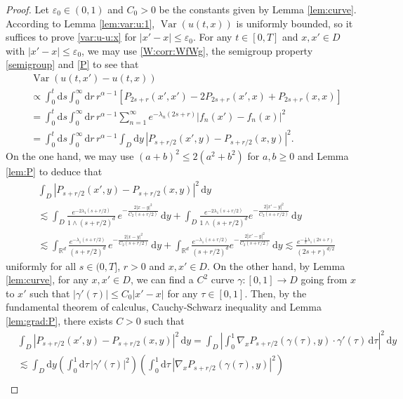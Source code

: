 \documentclass[reqno]{amsart}
\DeclareMathOperator{\Var}{Var}
\newcommand{\R}{\mathbb R}
\renewcommand{\d}{\mathrm d}
\newcommand{\1}{\mathbf 1}
\numberwithin{equation}{section}
\theoremstyle{definition}
\begin{document}
\begin{proof}
Let $\varepsilon_0 \in (0,1)$ and $C_0>0$ be the constants given by Lemma \ref{lem:curve}.
According to Lemma \ref{lem:var:u:1}, $\Var(u(t,x))$ is uniformly bounded, so it suffices to prove \eqref{var:u-u:x} for $|x'-x| \le \varepsilon_0$.
For any $t \in [0,T]$ and $x,x' \in D$ with $|x'-x|\le \varepsilon_0$, we may use \eqref{W:corr:WfWg}, the semigroup property \eqref{semigroup} and \eqref{P} to see that
\begin{align*}
	&\Var(u(t,x')-u(t,x))\\
	&\propto \int_0^t \d s \int_0^\infty \d r \, r^{\alpha-1} \left[ P_{2s+r}(x',x') - 2P_{2s+r}(x',x)+ P_{2s+r}(x,x) \right]\\
	&=\int_0^t \d s \int_0^\infty \d r \, r^{\alpha-1} \sum_{n=1}^\infty e^{-\lambda_n (2s+r)} |f_n(x')-f_n(x)|^2\\
	&=\int_0^t \d s \int_0^\infty \d r \, r^{\alpha-1} \int_D \d y\, |P_{s+r/2}(x',y)-P_{s+r/2}(x,y)|^2.
\end{align*}
On the one hand, we may use $(a+b)^2 \le 2(a^2+b^2)$ for $a,b \ge 0$ and Lemma \ref{lem:P} to deduce that
\begin{align*}
	&\int_D |P_{s+r/2}(x',y)-P_{s+r/2}(x,y)|^2 \, \d y\\
	& \lesssim \int_D \frac{e^{-2\lambda_1 (s+r/2)}}{1 \wedge (s+r/2)^d} \, e^{- \frac{2|x-y|^2}{C_2(s+r/2)}} \, \d y + \int_D \frac{e^{-2\lambda_1 (s+r/2)}}{1\wedge (s+r/2)^d} e^{- \frac{2|x'-y|^2}{C_2(s+r/2)}}  \, \d y\\
	& \lesssim \int_{\R^d} \frac{e^{-\lambda_1 (s+r/2)}}{(s+r/2)^d} \, e^{- \frac{2|x-y|^2}{C_2(s+r/2)}} \, \d y + \int_{\R^d} \frac{e^{-\lambda_1 (s+r/2)}}{ (s+r/2)^d} e^{- \frac{2|x'-y|^2}{C_2(s+r/2)}}  \, \d y
	\lesssim \frac{e^{-\frac12\lambda_1(2s+r)}}{(2s+r)^{d/2}}
\end{align*}
uniformly for all $s \in (0,T]$, $r > 0$ and $x,x'\in D$.
On the other hand, by Lemma \ref{lem:curve}, for any $x,x'\in D$, we can find a $C^2$ curve $\gamma:[0,1] \to D$ going from $x$ to $x'$ such that $|\gamma'(\tau)| \le C_0|x'-x|$ for any $\tau \in [0,1]$.
Then, by the fundamental theorem of calculus, Cauchy-Schwarz inequality and Lemma \ref{lem:grad:P}, there exists $C>0$ such that
\begin{align*}
	&\int_D |P_{s+r/2}(x',y)-P_{s+r/2}(x,y)|^2 \, \d y
	= \int_D\left| \int_0^1 \nabla_x P_{s+r/2}(\gamma(\tau),y) \cdot \gamma'(\tau) \, \d \tau \right|^2 \,  \d y \\
	& \lesssim \int_D \d y \left( \int_0^1 \d \tau\, |\gamma'(\tau)|^2 \right) \left( \int_0^1 \d \tau  \, |\nabla_x P_{s+r/2}(\gamma(\tau),y)|^2 \right)\\

\end{align*}
\end{proof}
\end{document}
